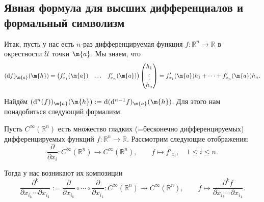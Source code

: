 \subsection{Явная формула для высших дифференциалов и формальный символизм}

Итак, пусть у нас есть $n$-раз дифференцируемая функция $f:\mathbb{R}^n \to \mathbb{R}$ в окрестности $\mathscr{U}$ точки $\m{a}$. Мы знаем, что
\[
 (\mathrm{d}f)_\m{a}(\m{h}) = \begin{pmatrix}
     f'_{x_1}(\m{a}) & \ldots & f'_{x_n}(\m{a})
 \end{pmatrix} \begin{pmatrix}
      h_1 \\ \vdots \\ h_n
 \end{pmatrix} = f_{x_1}'(\m{a})h_1 + \cdots + f_{x_n}'(\m{a})h_n.
\]

Найдём $(\mathrm{d}^n(f))_\m{a}(\m{h}): = \mathrm{d}(\mathrm{d}^{n-1}f)_\m{a}(\m{h})$. Для этого нам понадобиться следующий формализм.

Пусть $C^\infty(\mathbb{R}^n)$ есть множество гладких (=бесконечно дифференцируемых) дифференцируемых функций $f:\mathbb{R}^n \to \mathbb{R}$. Рассмотрим следующие отображения:
\[
 \frac{\partial}{\partial x_i}: C^\infty(\mathbb{R}^n) \to C^\infty(\mathbb{R}^n), \qquad f\mapsto f'_{x_i}, \quad 1 \le i \le n.
\]

Тогда у нас возникают их композиции 
\[
 \frac{\partial^k}{\partial x_{i_k} \cdots \partial x_{i_1}}:=\dfrac{\partial}{\partial x_{i_k}} \circ \cdots \circ \dfrac{\partial}{\partial x_{i_1}}:  C^\infty(\mathbb{R}^n) \to C^\infty(\mathbb{R}^n), \qquad f \mapsto \frac{\partial^k f}{\partial x_{i_k} \cdots \partial x_{i_1}}.
\]




